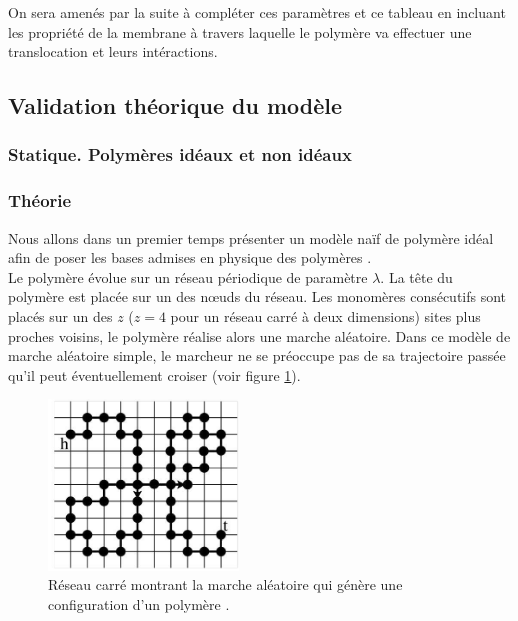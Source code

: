 \documentclass[a4paper,11pt]{article}
\begin{document}

On sera amenés par la suite à compléter ces paramètres et ce tableau en incluant les propriété de la membrane à travers laquelle le polymère va effectuer une translocation et leurs intéractions.

\subsection{Validation théorique du modèle}

\subsubsection{Statique. Polymères idéaux et non idéaux}
\subsubsection*{Théorie}
Nous allons dans un premier temps présenter un modèle naïf de polymère idéal afin de poser les bases admises en physique des polymères \cite{sung,these}.\\

Le polymère évolue sur un réseau périodique de paramètre $\lambda$. La tête du polymère est placée sur un des nœuds du réseau. Les monomères consécutifs sont placés sur un des $z$ ($z=4$ pour un réseau carré à deux dimensions) sites plus proches voisins, le polymère réalise alors une marche aléatoire. Dans ce modèle de marche aléatoire simple, le marcheur ne se préoccupe pas de sa trajectoire passée qu'il peut éventuellement croiser (voir figure \ref{resideal}).

\begin{figure}[H]
\begin{center}
\includegraphics[width=0.45\textwidth]{resideal.jpg}

\caption{Réseau carré montrant la marche aléatoire qui génère une configuration d'un polymère \cite{these}.}
\label{resideal}
\end{center}
\end{figure}
\end{document}
